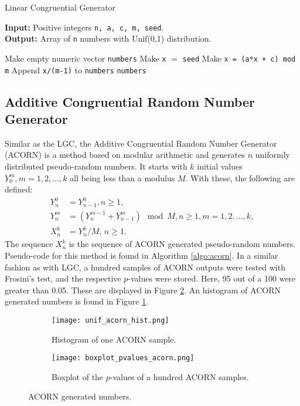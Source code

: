 \documentclass[letterpaper, 10 pt, conference]{article}
\begin{document}
\begin{algorithm}
	\caption{Linear Congruential Generator}
	\begin{flushleft}
		\textbf{Input: } Positive integers \texttt{n, a, c, m, seed}.
		\\ \textbf{Output: } Array of \texttt{n} numbers with $\mathrm{Unif}$(0,1) distribution.
	\end{flushleft}
	
	\begin{algorithmic}[1]
		\State Make empty numeric vector \texttt{numbers}
		\State Make \texttt{x} $=$ \texttt{seed}
			\State Make \texttt{x = (a*x + c) mod m}
			\State Append \texttt{x/(m-1)} to \texttt{numbers}
		\EndWhile
		\State \Return \texttt{numbers}
	\end{algorithmic}
	\label{algo:lgc}
\end{algorithm}

\subsection{Additive Congruential Random Number Generator}
Similar as the \textsc{LGC}, the Additive Congruential Random Number Generator (\textsc{ACORN}) \cite{Wikramaratna_1989}  is a method based on modular arithmetic and generates $n$ uniformly distributed pseudo-random numbers. It starts with $k$ initial values $Y_{0}^{m}, m = 1, 2, \dots, k$ all being less than a modulus $M$. With these, the following are defined:
\begin{align}
Y_{n}^{0} &= Y_{n-1}^{0}, n \geq 1, \\
Y_{n}^{m} &= (Y_{n}^{m-1} + Y_{n-1}^{m} ) \mod M, n \geq 1, m =  1, 2, \dots, k, \\
X_{n}^{k}  &= Y_{n}^{k} / M,  \, n \geq 1.
\end{align}
The sequence $X_{n}^{k}$ is the sequence of \textsc{ACORN} generated pseudo-random numbers. Pseudo-code for this method is found in Algorithm \ref{algo:acorn}. In a similar fashion as with \textsc{LGC}, a hundred samples of \textsc{ACORN} outputs were tested with Frosini's test, and the respective $p$-values were stored. Here, 95 out of a 100 were greater than 0.05. These are displayed in Figure \ref{fig:boxplot_pvalues_acorn}. An histogram of \textsc{ACORN} generated numbers is found in Figure \ref{fig:unif_acorn_hist}.

 \begin{figure}
	\centering
	\begin{subfigure}[b]{0.45\linewidth}
		\texttt{[image: unif\_acorn\_hist.png]}
		\caption{Histogram of one \textsc{ACORN} sample.}
		\label{fig:unif_acorn_hist}
	\end{subfigure}
	\begin{subfigure}[b]{0.45\linewidth}
		\texttt{[image: boxplot\_pvalues\_acorn.png]}
		\caption{Boxplot of the $p$-values of a hundred \textsc{ACORN} samples.}
		\label{fig:boxplot_pvalues_acorn}
	\end{subfigure}
	\caption{\textsc{ACORN} generated numbers.} 
	\label{fig:acorn}
\end{figure}
\end{document}
